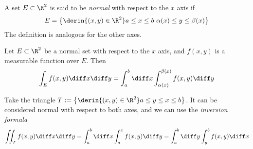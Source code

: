 \documentclass[../mmf.tex]{subfiles}
\begin{document}
\begin{dfn}
	A set $E\subset\R^2$ is said to be \textit{normal} with respect to the $x$ axis if
	\begin{equation*}
		E=\left\{ \derin{(x,y)\in\R^2}a\le x\le b\ \alpha(x)\le y\le\beta(x) \right\}
	\end{equation*}
	The definition is analogous for the other axes.
\end{dfn}
\begin{thm}
	Let $E\subset\R^2$ be a normal set with respect to the $x$ axis, and $f(x,y)$ is a measurable function over $E$. Then
	\begin{equation}
		\int_{E}^{}f(x,y)\diff x\diff y=\int_{a}^{b}\diff x\int_{\alpha(x)}^{\beta(x)}f(x,y)\diff y
		\label{eq:normalintegration}
	\end{equation}
\end{thm}
\begin{thm}
	Take the triangle $T:=\left\{ \derin{(x,y)\in\R^2}a\le y\le x\le b \right\}$. It can be considered normal with respect to both axes, and we can use the \textit{inversion formula}
	\begin{equation}
		\iint_Tf(x,y)\diff x\diff y=\int_{a}^{b}\diff x\int_{a}^{x}f(x,y)\diff y=\int_{a}^{b}\diff y\int_{y}^{b}f(x,y)\diff x
		\label{eq:dirinversionformula}
	\end{equation}
\end{thm}
\end{document}
